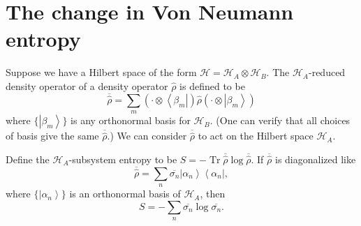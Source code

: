 \documentclass[11pt]{article}
\newcommand{\bra}[1]{\left\langle#1\right|}
\newcommand{\ket}[1]{\left|#1\right\rangle}
\newcommand{\hilb}{\mathcal{H}}
\newcommand{\op}[1]{\hat{#1}}
\theoremstyle{theorem}
\theoremstyle{remark}
\theoremstyle{step}
\theoremstyle{gap}
\begin{document}
\section{The change in Von Neumann entropy}

Suppose we have a Hilbert space of the form \(\hilb = \hilb_A \otimes \hilb_B\). The \(\hilb_A\)-reduced density operator of a density operator \(\op{\rho}\) is defined to be
\[\overline{\op{\rho}} = \sum_m \left(\cdot\otimes\bra{\beta_m}\right) \op{\rho} \left(\cdot\otimes\ket{\beta_m}\right)\]
where \(\{\ket{\beta_m}\}\) is any orthonormal basis for \(\hilb_B\). (One can verify that all choices of basis give the same \(\overline{\op{\rho}}\).)
We can consider \(\overline{\op{\rho}}\) to act on the Hilbert space \(\hilb_A\).

Define the \(\hilb_A\)-subsystem entropy to be \(S = -\operatorname{Tr} \overline{\op{\rho}} \log \overline{\op{\rho}}\). If \(\overline{\op{\rho}}\) is diagonalized like
\begin{equation}\label{eq.redrhodef}
\overline{\op{\rho}} = \sum_n \overline{\sigma_n} \ket{\alpha_n}\bra{\alpha_n},
\end{equation}
where \(\{\ket{\alpha_n}\}\) is an orthonormal basis of \(\hilb_A\), then
\begin{equation}\label{eq.entropydefinition}
S = -\sum_n \overline{\sigma_n} \log \overline{\sigma_n}.
\end{equation}
\end{document}
